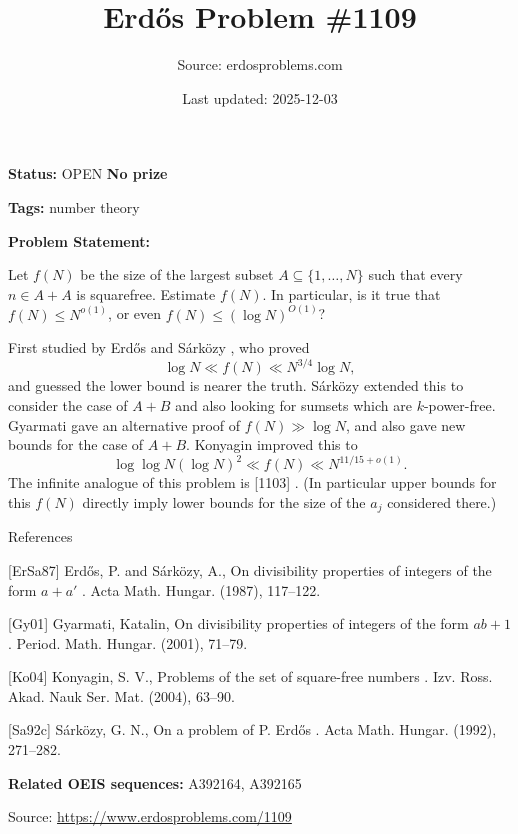 \documentclass{article}
\title{Erd\H{o}s Problem \#1109}
\date{Last updated: 2025-12-03}
\author{Source: erdosproblems.com}
\begin{document}
\maketitle

\noindent\textbf{Status:} OPEN \quad \textbf{No prize}

\noindent\textbf{Tags:} number theory

\medskip

\noindent\textbf{Problem Statement:}

Let $f(N)$ be the size of the largest subset $A\subseteq \{1,\ldots,N\}$ such that every $n\in A+A$ is squarefree. Estimate $f(N)$. In particular, is it true that $f(N)\leq N^{o(1)}$, or even $f(N) \leq (\log N)^{O(1)}$?




First studied by Erd\H{o}s and S\'{a}rk\"{o}zy \cite{ErSa87}, who proved\[\log N \ll f(N) \ll N^{3/4}\log N,\]and guessed the lower bound is nearer the truth. S\'{a}rk\"{o}zy \cite{Sa92c} extended this to consider the case of $A+B$ and also looking for sumsets which are $k$-power-free. Gyarmati \cite{Gy01} gave an alternative proof of $f(N)\gg \log N$, and also gave new bounds for the case of $A+B$. Konyagin \cite{Ko04} improved this to\[ \log\log N(\log N)^2\ll f(N) \ll N^{11/15+o(1)}.\]The infinite analogue of this problem is [1103] . (In particular upper bounds for this $f(N)$ directly imply lower bounds for the size of the $a_j$ considered there.)




References

[ErSa87] Erd\H{o}s, P. and S\'{a}rk\"ozy, A., On divisibility properties of integers of the form {$a+a'$} . Acta Math. Hungar. (1987), 117--122.

[Gy01] Gyarmati, Katalin, On divisibility properties of integers of the form {$ab+1$} . Period. Math. Hungar. (2001), 71--79.

[Ko04] Konyagin, S. V., Problems of the set of square-free numbers . Izv. Ross. Akad. Nauk Ser. Mat. (2004), 63--90.

[Sa92c] S\'{a}rk\"ozy, G. N., On a problem of {P}. {E}rd\H{o}s . Acta Math. Hungar. (1992), 271--282.

\noindent\textbf{Related OEIS sequences:} A392164, A392165


\bigskip
\noindent\small{Source: \url{https://www.erdosproblems.com/1109}}
\end{document}
